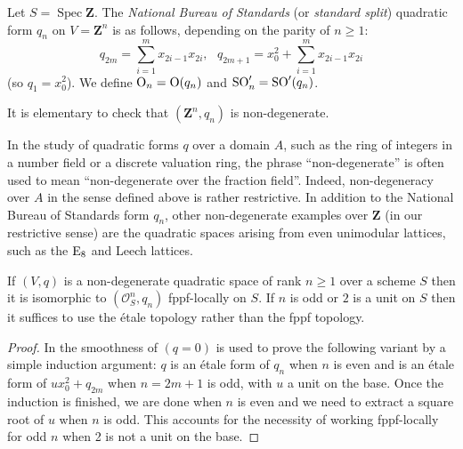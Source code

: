 \documentclass[10pt]{article}
\renewcommand{\(}{\left(}
\renewcommand{\)}{\right)}
\newcommand{\Spec}{\operatorname{Spec}}
\numberwithin{thm}{subsection}
\begin{document}
 \begin{defn}
Let $S = \Spec {\mathbf{Z}}$.
The {\em National Bureau of Standards} (or {\em standard split}) 
quadratic form $q_n$ on $V = {\mathbf{Z}}^n$ is as follows, depending
 on the parity of $n \ge 1$:
 $$q_{2m} = \sum_{i=1}^m x_{2i-1} x_{2i},\,\,\,\,
 q_{2m+1} = x_0^2 + \sum_{i=1}^m x_{2i-1} x_{2i}$$
 (so $q_1 = x_0^2$). 
 We define ${\rm{O}}_n = {\rm{O}}(q_n)$ and ${\rm{SO}}'_n = {\rm{SO}}'(q_n)$.
 \end{defn}
 
 It is elementary to check that $({\mathbf{Z}}^n, q_n)$ is non-degenerate. 
 
\begin{rem}\label{ndrem}  
In the study of quadratic forms $q$ over a domain $A$, such as the ring of
integers in a number field or a discrete valuation ring, the phrase ``non-degenerate''
is often used to mean ``non-degenerate over the fraction field''.  Indeed, non-degeneracy over $A$
in the sense defined above is rather restrictive.  
In addition to the National Bureau of Standards form $q_n$,
other non-degenerate examples over ${\mathbf{Z}}$
(in our restrictive sense) are the quadratic spaces arising from even unimodular lattices, such as 
the ${\rm{E}}_8$ and Leech lattices. 
  \end{rem}
  
 \begin{lem}\label{stdq}
 If $(V,q)$ is a non-degenerate quadratic space of rank $n \ge 1$ over a scheme $S$ 
then it  is isomorphic to $(\mathscr{O}_S^n, q_n)$ fppf-locally on $S$.
 If $n$ is odd or $2$ is a unit on $S$ then it suffices to use the \'etale topology
 rather than the fppf topology.
 \end{lem}
 
 \begin{proof}
 In \cite[XII, Prop.\,1.2]{sga7} the smoothness
 of $(q=0)$ is used to prove the following variant by a simple induction argument: 
 $q$ is an \'etale form of $q_n$ when $n$ is even
 and is an \'etale form of $u x_0^2 + q_{2m}$ when $n = 2m+1$ is odd, with $u$ a unit on the base.
Once the induction is finished, we are done when
$n$ is even and we need to extract a square root of $u$ when $n$ is odd.
This accounts for the necessity of working fppf-locally for odd $n$ when
2 is not a unit on the base. 
 \end{proof}
 
\end{document}
